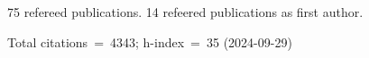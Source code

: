 75 refereed publications. 14 refeered publications as first author.

Total citations~=~4343; h-index~=~35 (2024-09-29)